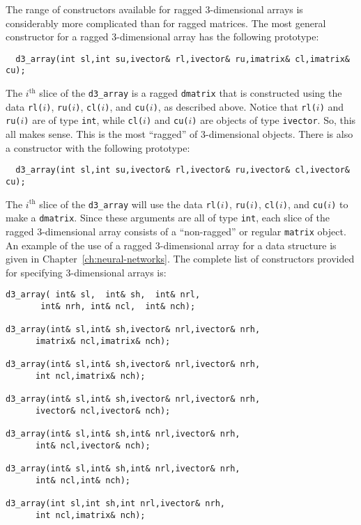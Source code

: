\documentclass{admbmanual}
\begin{document}
The range of constructors available for ragged 3-dimensional arrays
is considerably more complicated than for ragged matrices. 
The most general constructor for a ragged 3-dimensional array
has the following prototype:
\begin{lstlisting}
  d3_array(int sl,int su,ivector& rl,ivector& ru,imatrix& cl,imatrix& cu);
\end{lstlisting}

The $i^\textrm{th}$ slice of the \texttt{d3\_array} is a ragged \texttt{dmatrix} 
that is constructed using the data 
\texttt{rl($i$)}, \texttt{ru($i$)}, \texttt{cl($i$)}, and \texttt{cu($i$)}, as
described above. Notice that \texttt{rl($i$)} and \texttt{ru($i$)} are of type \texttt{int}, 
while \texttt{cl($i$)} and \texttt{cu($i$)} are objects of type \texttt{ivector}. 
So, this all makes sense. This is the most ``ragged'' of
3-dimensional objects. There is also a constructor with the following
prototype:
\begin{lstlisting}
  d3_array(int sl,int su,ivector& rl,ivector& ru,ivector& cl,ivector& cu);
\end{lstlisting}
The $i^\textrm{th}$ slice of the \texttt{d3\_array} will use the data 
\texttt{rl($i$)}, \texttt{ru($i$)}, \texttt{cl($i$)}, and \texttt{cu($i$)} to make a \texttt{dmatrix}.
Since these arguments are all of type \texttt{int}, each slice
of the ragged 3-dimensional array consists of a ``non-ragged''
or regular \texttt{matrix} object.
An example of the use of a ragged 3-dimensional array for 
a data structure is given in Chapter~\ref{ch:neural-networks}.
The complete list of constructors provided for specifying 3-dimensional
arrays is:
\begin{lstlisting}
d3_array( int& sl,  int& sh,  int& nrl,
       int& nrh, int& ncl,  int& nch);

d3_array(int& sl,int& sh,ivector& nrl,ivector& nrh,
      imatrix& ncl,imatrix& nch);
 
d3_array(int& sl,int& sh,ivector& nrl,ivector& nrh,
      int ncl,imatrix& nch);
 
d3_array(int& sl,int& sh,ivector& nrl,ivector& nrh,
      ivector& ncl,ivector& nch);
 
d3_array(int& sl,int& sh,int& nrl,ivector& nrh,
      int& ncl,ivector& nch);
 
d3_array(int& sl,int& sh,int& nrl,ivector& nrh,
      int& ncl,int& nch);
 
d3_array(int sl,int sh,int nrl,ivector& nrh,
      int ncl,imatrix& nch);
\end{lstlisting}
\end{document}
